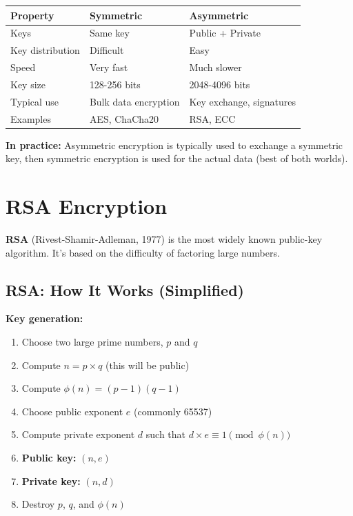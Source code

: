 \documentclass[11pt,a4paper]{report}
\begin{document}
\begin{center}
\begin{tabular}{|l|l|l|}
\hline
\textbf{Property} & \textbf{Symmetric} & \textbf{Asymmetric} \\
\hline
Keys & Same key & Public + Private \\
Key distribution & Difficult & Easy \\
Speed & Very fast & Much slower \\
Key size & 128-256 bits & 2048-4096 bits \\
Typical use & Bulk data encryption & Key exchange, signatures \\
Examples & AES, ChaCha20 & RSA, ECC \\
\hline
\end{tabular}
\end{center}

\textbf{In practice:} Asymmetric encryption is typically used to exchange a symmetric key, then symmetric encryption is used for the actual data (best of both worlds).

\newpage
\section{RSA Encryption}

\textbf{RSA} (Rivest-Shamir-Adleman, 1977) is the most widely known public-key algorithm. It's based on the difficulty of factoring large numbers.

\subsection{RSA: How It Works (Simplified)}

\textbf{Key generation:}
\begin{enumerate}
\item Choose two large prime numbers, $p$ and $q$
\item Compute $n = p \times q$ (this will be public)
\item Compute $\phi(n) = (p-1)(q-1)$
\item Choose public exponent $e$ (commonly 65537)
\item Compute private exponent $d$ such that $d \times e \equiv 1 \pmod{\phi(n)}$
\item \textbf{Public key:} $(n, e)$
\item \textbf{Private key:} $(n, d)$
\item Destroy $p$, $q$, and $\phi(n)$
\end{enumerate}
\end{document}
